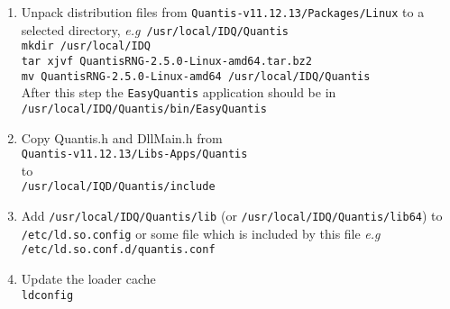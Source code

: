 \documentclass[a4paper,11pt]{article}
\newcommand{\eg}{\textsl{e.g}}
\newcommand{\QuantisDistVersion}{Quantis-v11.12.13}
\begin{document}
\begin{enumerate}
    \item Unpack distribution files from
    \texttt{\QuantisDistVersion /Packages/Linux} to a selected directory, \eg\
    \texttt{/usr/local/IDQ/Quantis}\\ \texttt{mkdir /usr/local/IDQ}\\
    \texttt{tar xjvf QuantisRNG-2.5.0-Linux-amd64.tar.bz2}\\ \texttt{mv
    QuantisRNG-2.5.0-Linux-amd64 /usr/local/IDQ/Quantis}\\ After this step the
    \texttt{EasyQuantis} application should be in\\
    \texttt{/usr/local/IDQ/Quantis/bin/EasyQuantis}
    \item Copy {Quantis.h} and {DllMain.h} from\\
    \texttt{\QuantisDistVersion /Libs-Apps/Quantis}\\ to\\
    \texttt{/usr/local/IQD/Quantis/include}
    \item Add \texttt{/usr/local/IDQ/Quantis/lib} (or
    \texttt{/usr/local/IDQ/Quantis/lib64}) to \\ \texttt{/etc/ld.so.config} or
    some file which is included by this file \eg\ \\
    \texttt{/etc/ld.so.conf.d/quantis.conf}
    \item Update the loader cache\\
    \texttt{ldconfig}
\end{enumerate}
\end{document}
